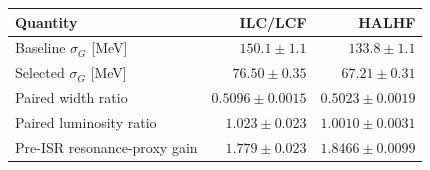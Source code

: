 \begin{tabular}{@{}lrr@{}}
\toprule
Quantity & ILC/LCF & HALHF\\
\midrule
Baseline $\sigma_G$ [MeV] & $150.1\pm1.1$ & $133.8\pm1.1$\\
Selected $\sigma_G$ [MeV] & $76.50\pm0.35$ & $67.21\pm0.31$\\
Paired width ratio & $0.5096\pm0.0015$ & $0.5023\pm0.0019$\\
Paired luminosity ratio & $1.023\pm0.023$ & $1.0010\pm0.0031$\\
Pre-ISR resonance-proxy gain & $1.779\pm0.023$ & $1.8466\pm0.0099$\\
\bottomrule
\end{tabular}
